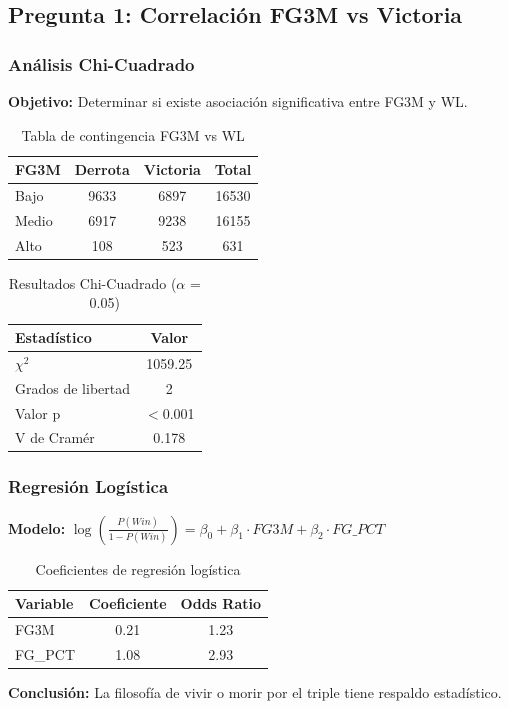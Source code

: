 \subsection{Pregunta 1: Correlación FG3M vs Victoria}

\subsubsection{Análisis Chi-Cuadrado}

\textbf{Objetivo:} Determinar si existe asociación significativa entre FG3M y WL.

\begin{table}[H]
\centering
\begin{tabular}{|l|c|c|c|}
\hline
\textbf{FG3M} & \textbf{Derrota} & \textbf{Victoria} & \textbf{Total} \\
\hline
Bajo & 9633 & 6897 & 16530 \\
Medio & 6917 & 9238 & 16155 \\
Alto & 108 & 523 & 631 \\
\hline
\end{tabular}
\caption{Tabla de contingencia FG3M vs WL}
\end{table}

\begin{table}[H]
\centering
\begin{tabular}{|l|c|}
\hline
\textbf{Estadístico} & \textbf{Valor} \\
\hline
$\chi^2$ & 1059.25 \\
Grados de libertad & 2 \\
Valor p & $<$0.001 \\
V de Cramér & 0.178 \\
\hline
\end{tabular}
\caption{Resultados Chi-Cuadrado ($\alpha$ = 0.05)}
\end{table}

\subsubsection{Regresión Logística}

\textbf{Modelo:} $\log\left(\frac{P(Win)}{1-P(Win)}\right) = \beta_0 + \beta_1 \cdot FG3M + \beta_2 \cdot FG\_PCT$

\begin{table}[H]
\centering
\begin{tabular}{|l|c|c|}
\hline
\textbf{Variable} & \textbf{Coeficiente} & \textbf{Odds Ratio} \\
\hline
FG3M & 0.21 & 1.23 \\
FG\_PCT & 1.08 & 2.93 \\
\hline
\end{tabular}
\caption{Coeficientes de regresión logística}
\end{table}

\textbf{Conclusión:} La filosofía de vivir o morir por el triple tiene respaldo estadístico.
